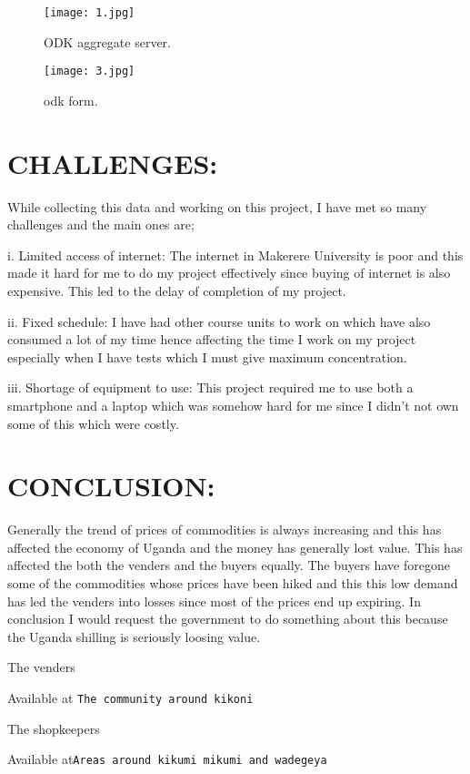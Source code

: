 \documentclass[14pt]{article}
\begin{document}
\begin{figure}[h!]
\texttt{[image: 1.jpg]}
\caption{ODK aggregate server.}
\label{figure1}
\end{figure}

\begin{figure}[h!]
\texttt{[image: 3.jpg]}
\caption{odk form.}
\label{figure2}
\end{figure}
\section{CHALLENGES:}
         While collecting this data and working on this project, I have met so many challenges and the main ones are;\par
i.	Limited access of internet: The internet in Makerere University is poor and this made it hard for me to do my project effectively since buying of internet is also expensive. This led to the delay of completion of my project.\par
ii.	Fixed schedule: I have had other course units to work on which have also consumed a lot of my time hence affecting the time I work on my project especially when I have tests which I must give maximum concentration.\par
iii.	Shortage of equipment to use: This project required me to use both a smartphone and a laptop which was somehow hard for me since I didn’t not own some of this which were costly.\par


\section{CONCLUSION:}
      Generally the trend of prices of commodities is always increasing and this has affected the economy of Uganda and the money has generally lost value. 
     This has affected the both the venders and the buyers equally. The buyers have foregone some of the commodities whose prices have been hiked and this this low demand has led the venders into losses since most of the prices end up expiring.
In conclusion I would request the government to do something about this because the Uganda shilling is seriously loosing value.

\begin{thebibliography}{10}

The venders

Available at \texttt{The community around kikoni}

The shopkeepers

Available at\texttt{Areas around kikumi mikumi and wadegeya}

\end{thebibliography}
\end{document}
